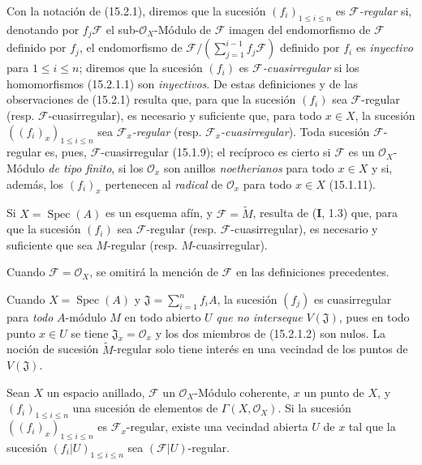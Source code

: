 \begin{env}[15.2.2]
\label{0.15.2.2-fr}
Con la notación de (15.2.1), diremos que la sucesión
$(f_i)_{1\leq i\leq n}$ es \emph{$\mathscr{F}$-regular} si, denotando por
$f_j\mathscr{F}$ el sub-$\mathcal{O}_X$-Módulo de $\mathscr{F}$ imagen del
endomorfismo de $\mathscr{F}$ definido por $f_j$, el endomorfismo de
$\mathscr{F}/(\sum_{j=1}^{i-1}f_j\mathscr{F})$ definido por $f_i$ es \emph{inyectivo}
para $1\leq i\leq n$; diremos que la sucesión $(f_i)$ es
\emph{$\mathscr{F}$-cuasirregular} si los homomorfismos (15.2.1.1) son \emph{inyectivos}.
De estas definiciones y de las observaciones de (15.2.1) resulta que, para que
la sucesión $(f_i)$ sea $\mathscr{F}$-regular (resp.
$\mathscr{F}$-cuasirregular), es necesario y suficiente que, para todo
$x\in X$, la sucesión $((f_i)_x)_{1\leq i\leq n}$ sea
\emph{$\mathscr{F}_x$-regular} (resp. \emph{$\mathscr{F}_x$-cuasirregular}). Toda sucesión
$\mathscr{F}$-regular es, pues, $\mathscr{F}$-cuasirregular (15.1.9); el
recíproco es cierto si $\mathscr{F}$ es un $\mathcal{O}_X$-Módulo \emph{de tipo
finito}, si los $\mathcal{O}_x$ son anillos \emph{noetherianos} para todo $x\in X$ y
si, además, los $(f_i)_x$ pertenecen al \emph{radical} de $\mathcal{O}_x$ para todo
$x\in X$ (15.1.11).

Si $X=\operatorname{Spec}(A)$ es un esquema afín, y
$\mathscr{F}=\widetilde{M}$, resulta de (\textbf I, 1.3) que, para que la sucesión
$(f_i)$ sea $\mathscr{F}$-regular (resp. $\mathscr{F}$-cuasirregular), es
necesario y suficiente que sea $M$-regular (resp. $M$-cuasirregular).

Cuando $\mathscr{F}=\mathcal{O}_X$, se omitirá la mención de $\mathscr{F}$ en
las definiciones precedentes.
\end{env}

\begin{remark}[15.2.3]
\label{0.15.2.3-fr}
Cuando $X=\operatorname{Spec}(A)$ y
$\mathfrak{J}=\sum_{i=1}^n f_iA$, la sucesión $(f_j)$ es cuasirregular para
\emph{todo} $A$-módulo $M$ en todo abierto $U$ \emph{que no interseque}
$V(\mathfrak{J})$, pues en todo punto $x\in U$ se tiene
$\mathfrak{J}_x=\mathcal{O}_x$ y los dos miembros de (15.2.1.2) son nulos. La
noción de sucesión $\widetilde{M}$-regular solo tiene interés en una vecindad de
los puntos de $V(\mathfrak{J})$.
\end{remark}

\begin{proposition}[15.2.4]
\label{0.15.2.4-fr}
Sean $X$ un espacio anillado, $\mathscr{F}$ un $\mathcal{O}_X$-Módulo
coherente, $x$ un punto de $X$, y $(f_i)_{1\leq i\leq n}$ una sucesión de
elementos de $\Gamma(X,\mathcal{O}_X)$. Si la sucesión
$((f_i)_x)_{1\leq i\leq n}$ es $\mathscr{F}_x$-regular, existe una vecindad
abierta $U$ de $x$ tal que la sucesión $(f_i|U)_{1\leq i\leq n}$ sea
$(\mathscr{F}|U)$-regular.
\end{proposition}


